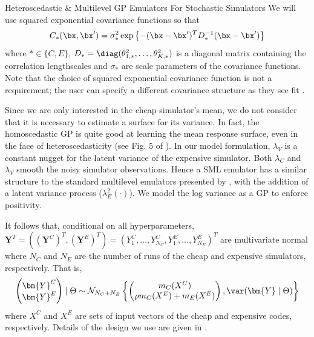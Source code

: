\begin{chapter}{Heteroscedastic \& Multilevel GP Emulators For Stochastic Simulators\label{Ch:Hetsml}}
We will use squared exponential covariance functions so that
\begin{equation*}
  C_{*}(\bx, \bx') =  \sigma^2_{*} \exp\left\{ -(\bx - \bx')^T D^{-1}_{*}(\bx -  \bx')\right\}
\end{equation*}
where $* \in \{C, E\}$, $D_{*} = \diag(\theta_{1, *}^2, \ldots, \theta_{K, *}^2)$ is a diagonal matrix containing the correlation lengthscales and $\sigma_*$ are scale parameters of the covariance functions. Note that the choice  of squared exponential covariance function is not a requirement;  the user can specify a different covariance structure as they see fit \citep{Rasmussen2006}.

Since we are only interested in the cheap simulator's mean, we do not consider that it is necessary to estimate a surface for its variance. In fact, the homoscedastic GP is quite good at learning the mean response surface, even in the face of heteroscedasticity (see Fig. $5$ of \cite{Binois2019}).  In our model formulation, $\lambda_{V}$ is a constant nugget for the latent variance of the expensive simulator. Both $\lambda_C$ and $\lambda_V$  smooth the noisy simulator observations. Hence a SML emulator has a similar structure to the standard multilevel emulators presented by \cite{Kennedy2000}, with the addition of a latent variance process ($\lambda_E^2(\cdot)$). We model the log variance as a GP to enforce positivity.

It follows that, conditional on all hyperparameters,\newline $\bm{Y}^T = \left( (\bm{Y}^C)^T, (\bm{Y}^E)^T \right)= (Y^C_1, \ldots, Y^C_{N_C}, Y^E_1, \ldots, Y^E_{N_E})^T$ are multivariate normal where $N_C$ and $N_E$ are the number of runs of the cheap and expensive simulators, respectively. That is,
\begin{equation}
\begin{pmatrix} \bm{Y}^C \\ \bm{Y}^E \end{pmatrix} \mid \Theta \sim \mathcal{N}_{N_C + N_E} \left\{ \begin{pmatrix} m_C(X^C) \\ \rho m_C(X^E) + m_E(X^E) \end{pmatrix}, \var(\bm{Y}\mid \Theta)\right\}
\end{equation}
where $X^C$ and $X^E$ are sets of input vectors of the cheap and expensive codes, respectively. Details of the design we use are given in .


\end{chapter}
